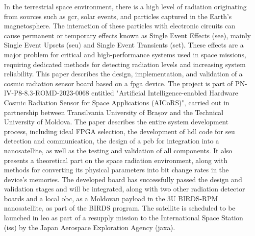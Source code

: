 \documentclass[12pt,a4paper]{report}
\begin{document}
In the terrestrial space environment, there is a high level of radiation originating from sources such as \acrfull{gcr}, solar events, and particles captured in the Earth's magnetosphere. The interaction of these particles with electronic circuits can cause permanent or temporary effects known as Single Event Effects (\gls{see}), mainly Single Event Upsets (\gls{seu}) and Single Event Transients (\gls{set}). These effects are a major problem for critical and high-performance systems used in space missions, requiring dedicated methods for detecting radiation levels and increasing system reliability. This paper describes the design, implementation, and validation of a cosmic radiation sensor board based on a \acrfull{fpga} device. The project is part of PN-IV-P8-8.3-ROMD-2023-0068 entitled "Artificial Intelligence-enabled Hardware Cosmic Radiation Sensor for Space Applications (AICoRS)", carried out in partnership between Transilvania University of Brașov and the Technical University of Moldova. The paper describes the entire system development process, including ideal FPGA selection, the development of \acrfull{hdl} code for \gls{seu} detection and communication, the design of a \acrfull{pcb} for integration into a nanosatellite, as well as the testing and validation of all components. It also presents a theoretical part on the space radiation environment, along with methods for converting its physical parameters into bit change rates in the device's memories. The developed board has successfully passed the design and validation stages and will be integrated, along with two other radiation detector boards and a local \acrfull{obc}, as a Moldovan payload in the 3U BIRDS-RPM nanosatellite, as part of the BIRDS program. The satellite is scheduled to be launched in \acrfull{leo} as part of a resupply mission to the International Space Station (\gls{iss}) by the Japan Aerospace Exploration Agency (\gls{jaxa}).
\end{document}
